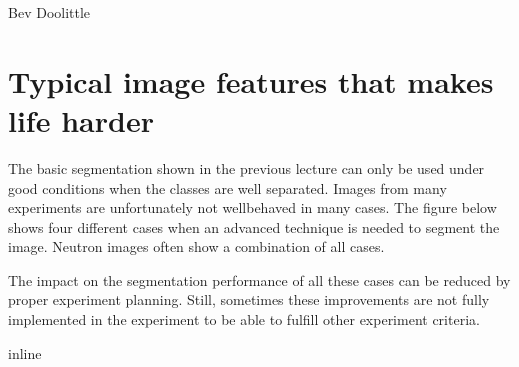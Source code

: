 \documentclass[letterpaper,10pt,english]{sphinxmanual}
\begin{document}
\sphinxAtStartPar
{} Bev Doolittle


\section{Typical image features that makes life harder}
\label{\detokenize{05-AdvancedSegmentation:typical-image-features-that-makes-life-harder}}
\sphinxAtStartPar
The basic segmentation shown in the previous lecture can only be used under good conditions when the classes are well separated. Images from many experiments are unfortunately not well\sphinxhyphen{}behaved in many cases. The figure below shows four different cases when an advanced technique is needed to segment the image. Neutron images often show a combination of all cases.

\sphinxAtStartPar
The impact on the segmentation performance of all these cases can be reduced by proper experiment planning. Still, sometimes these improvements are not fully implemented in the experiment to be able to fulfill other experiment criteria.

\begin{sphinxVerbatim}[commandchars=\\\{\}]
 inline
   
   
   
\end{sphinxVerbatim}
\end{document}
